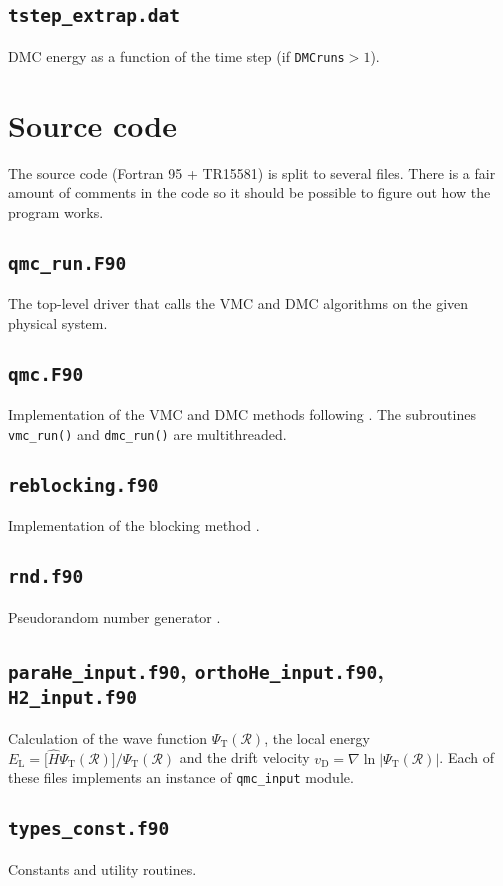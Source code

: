 \documentclass[12pt,a4paper]{article}
\def\code#1{{\lstinline$#1$}}
\begin{document}
\subsection{\code{tstep_extrap.dat}}

DMC energy as a function of the time step (if \code{DMCruns}${}>1$).



\section{Source code}

The source code (Fortran 95 + TR15581) is split to several files. There is a fair
amount of comments in the code so it should be possible to figure out
how the program works.

\subsection{\code{qmc_run.F90}}

The top-level driver that calls the VMC and DMC algorithms on the
given physical system.

\subsection{\code{qmc.F90}}

Implementation of the VMC and DMC methods following
\cite{reynolds1982}. The subroutines
\code{vmc_run()} and \code{dmc_run()} are multithreaded.

\subsection{\code{reblocking.f90}}

Implementation of the blocking method \cite{flyvbjerg1989}.

\subsection{\code{rnd.f90}}

Pseudorandom number generator \cite{NRf90}.

\subsection{\code{paraHe_input.f90}, \code{orthoHe_input.f90},
  \code{H2_input.f90}}
\label{sec:qmc_input}

Calculation of the wave function $\Psi_\text{T}(\mathcal R)$, the local
energy $E_\text{L}=\bigl[\hat H \Psi_\text{T}(\mathcal
R)\bigr]/\Psi_\text{T}(\mathcal R)$ and the drift velocity
$v_\text{D}=\nabla\ln |\Psi_\text{T}(\mathcal R)|$. Each of these
files implements an instance of \code{qmc_input} module.

\subsection{\code{types_const.f90}}

Constants and utility routines.


\end{document}
